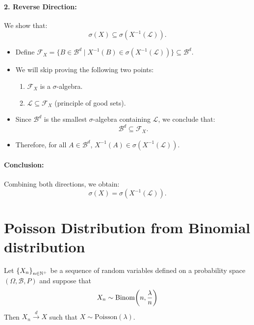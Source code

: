\begin{prf}
\begin{prf}
\paragraph{2. Reverse Direction:}  
We show that:
\[
\sigma(X) \subseteq \sigma\left(X^{-1}(\mathcal{L})\right).
\]
\begin{itemize}
    \item Define \(\mathscr{F}_X = \{ B \in \mathscr{B}^d \mid X^{-1}(B) \in \sigma(X^{-1}(\mathcal{L}))\}\subseteq \mathscr{B}^d\).
    \item We will skip proving the following two points:
    \begin{enumerate}
        \item \(\mathscr{F}_X\) is a \(\sigma\)-algebra.
        \item \(\mathcal{L} \subseteq \mathscr{F}_X\) (principle of good sets).
    \end{enumerate}
    \item Since \(\mathscr{B}^d\) is the smallest \(\sigma\)-algebra containing \(\mathcal{L}\), we conclude that:
    \[
    \mathscr{B}^d \subseteq \mathscr{F}_X.
    \]
    \item Therefore, for all \(A \in \mathscr{B}^d\), \(X^{-1}(A) \in \sigma(X^{-1}(\mathcal{L}))\).
\end{itemize}

\paragraph{Conclusion:}  
Combining both directions, we obtain:
\[
\sigma(X) = \sigma\left(X^{-1}(\mathcal{L})\right).
\]
	
\end{prf}


\section{Poisson Distribution from Binomial distribution}
\begin{thm}{}
Let $\qty{X_n}_{n\in \mathbb{N}^+}$ be a sequence of random variables defined on a probability space $(\Omega, \mathcal{B}, P)$ and suppose that
$$X_n\sim \mathrm{Binom}\qty(n, \frac{\lambda}{n})$$
Then $X_n\xrightarrow{d} X$ such that $X\sim \mathrm{Poisson}(\lambda)$. 
\end{thm}


\end{prf}

